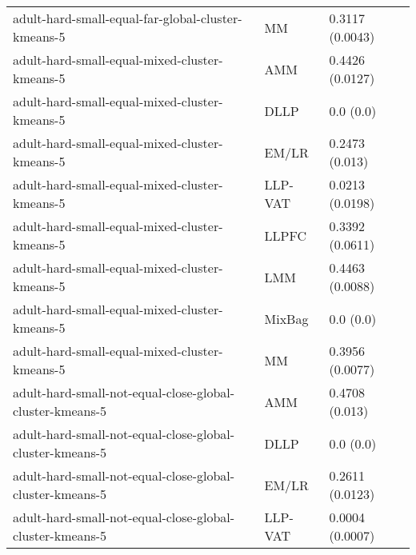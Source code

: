 \begin{longtable}{lll}
                                                           adult-hard-small-equal-far-global-cluster-kmeans-5 &        MM &                           0.3117 (0.0043) \\
                                                                adult-hard-small-equal-mixed-cluster-kmeans-5 &       AMM &                           0.4426 (0.0127) \\
                                                                adult-hard-small-equal-mixed-cluster-kmeans-5 &      DLLP &                                 0.0 (0.0) \\
                                                                adult-hard-small-equal-mixed-cluster-kmeans-5 &     EM/LR &                            0.2473 (0.013) \\
                                                                adult-hard-small-equal-mixed-cluster-kmeans-5 &   LLP-VAT &                           0.0213 (0.0198) \\
                                                                adult-hard-small-equal-mixed-cluster-kmeans-5 &     LLPFC &                           0.3392 (0.0611) \\
                                                                adult-hard-small-equal-mixed-cluster-kmeans-5 &       LMM &                           0.4463 (0.0088) \\
                                                                adult-hard-small-equal-mixed-cluster-kmeans-5 &    MixBag &                                 0.0 (0.0) \\
                                                                adult-hard-small-equal-mixed-cluster-kmeans-5 &        MM &                           0.3956 (0.0077) \\
                                                     adult-hard-small-not-equal-close-global-cluster-kmeans-5 &       AMM &                            0.4708 (0.013) \\
                                                     adult-hard-small-not-equal-close-global-cluster-kmeans-5 &      DLLP &                                 0.0 (0.0) \\
                                                     adult-hard-small-not-equal-close-global-cluster-kmeans-5 &     EM/LR &                           0.2611 (0.0123) \\
                                                     adult-hard-small-not-equal-close-global-cluster-kmeans-5 &   LLP-VAT &                           0.0004 (0.0007) \\

\end{longtable}
